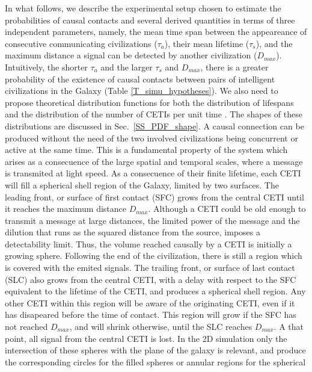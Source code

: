 \documentclass[crop]{CSLB}%
\begin{document}
In what follows, we describe the experimental setup chosen to estimate
the probabilities of causal contacts and several derived quantities in
terms of three independent parameters, namely, the mean time span
between the appeareance of consecutive communicating civilizations
($\tau_a$), their mean lifetime ($\tau_s$), and the maximum distance a
signal can be detected by another civilization ($D_{max}$).
%
Intuitively, the shorter $\tau_a$ and the larger $\tau_s$ and
$D_{max}$, there is a greater probability of the existence of causal
contacts between pairs of intelligent civilizations in the Galaxy
(Table \ref{T_simu_hypotheses}).
%
We also need to propose theoretical distribution functions for both the
distribution of lifespans and the distribution of the number of CETIs
per unit time \citep{maccone_evolution_2014,Sotos_biotechnology_2019}.
%
The shapes of these distributions are discussed in Sec.~\ref{SS_PDF_shape}.
%
A causal connection can be produced without the need of the two
involved civilizations being concurrent or active at the same time.
%
This is a fundamental property of the system which arises as a
consecuence of the large spatial and temporal scales, where a message
is transmited at light speed.
%
As a consecuence of their finite lifetime,
each CETI will fill a spherical shell region of the Galaxy, limited by two
surfaces.
%
The leading front, or surface of first contact (SFC) grows from the
central CETI until it reaches the maximum distance $D_{max}$.
%
Although a CETI could be old enough to transmit a message at large
distances, the limited power of the message and the dilution that runs
as the squared distance from the source, imposes a
detectability limit.
%
Thus, the volume reached causally by a CETI is initially a growing
sphere.
%
Following the end of the civilization, there is still a region which
is covered with the emited signals.
%
The trailing front, or surface of last contact (SLC) also grows from
the central CETI, with a delay with respect to the SFC equivalent to
the lifetime of the CETI, and produces a spherical shell region.
%
Any other CETI within this region will be aware of the originating CETI,
even if it has disapeared before the time of contact.
%
This region will grow if the SFC has not reached $D_{max}$, and
will shrink otherwise, until the SLC reaches $D_{max}$.
%
A that point, all signal from the central CETI is lost.
%
In the 2D simulation only the intersection of these spheres with the
plane of the galaxy is relevant, and produce the corresponding
circles for the filled spheres or annular regions for the spherical
\end{document}
